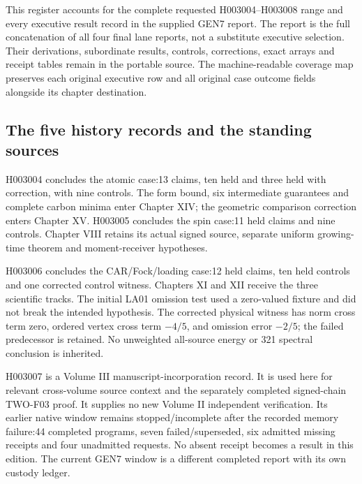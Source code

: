 \label{app:refinement-register-12}

This register accounts for the complete requested H003004--H003008 range
and every executive result record in the supplied GEN7 report. The report
is the full concatenation of all four final lane reports, not a substitute
executive selection. Their derivations, subordinate results, controls,
corrections, exact arrays and receipt tables remain in the portable source.
The machine-readable coverage map preserves each original executive row
and all original case outcome fields alongside its chapter destination.

\subsection{The five history records and the standing sources}
H003004 concludes the atomic case:13 claims, ten held and three held with
correction, with nine controls. The form bound, six intermediate guarantees
and complete carbon minima enter Chapter XIV; the geometric comparison
correction enters Chapter XV. H003005 concludes the spin case:11 held
claims and nine controls. Chapter VIII retains its actual signed source,
separate uniform growing-time theorem and moment-receiver hypotheses.

H003006 concludes the CAR/Fock/loading case:12 held claims, ten held
controls and one corrected control witness. Chapters XI and XII receive
the three scientific tracks. The initial LA01 omission test used a
zero-valued fixture and did not break the intended hypothesis. The corrected
physical witness has norm cross term zero, ordered vertex cross term
$-4/5$, and omission error $-2/5$; the failed predecessor is retained.
No unweighted all-source energy or 321 spectral conclusion is inherited.

H003007 is a Volume III manuscript-incorporation record. It is used here
for relevant cross-volume source context and the separately completed
signed-chain TWO-F03 proof. It supplies no new Volume II independent
verification. Its earlier native window remains stopped/incomplete after
the recorded memory failure:44 completed programs, seven failed/superseded,
six admitted missing receipts and four unadmitted requests. No absent
receipt becomes a result in this edition. The current GEN7 window is a
different completed report with its own custody ledger.

